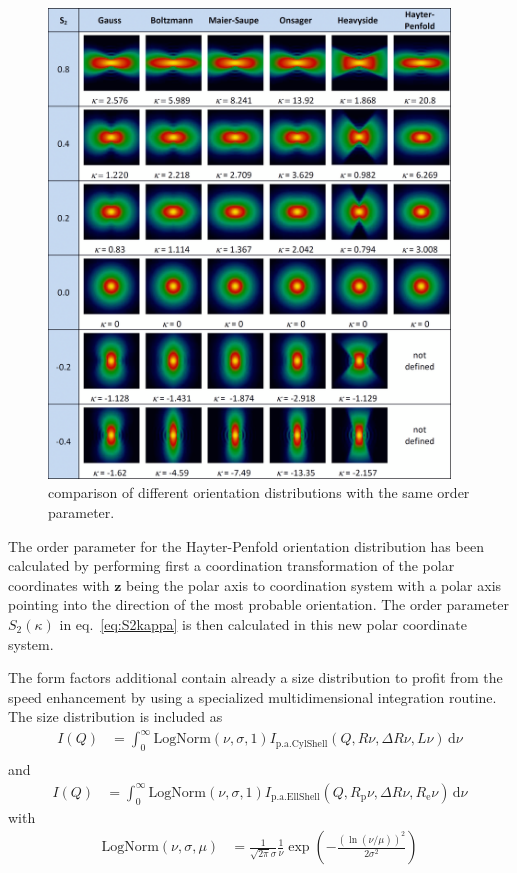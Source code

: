 \begin{figure}[htb]
\begin{center}
\includegraphics[width=0.95\textwidth]{../images/form_factor/cylindrical_obj/pXXXcomparison.png}
\end{center}
\caption{comparison of different orientation distributions with the same order parameter.}
\label{fig:S2_comparision}
\end{figure}

The order parameter for the Hayter-Penfold orientation distribution has been calculated by performing first a coordination transformation of the polar coordinates with $\mathbf{z}$ being the polar axis to coordination system with a polar axis pointing into the direction of the most probable orientation. The order parameter $S_2(\kappa)$ in eq.\ \ref{eq:S2kappa} is then calculated in this new polar coordinate system.

The form factors additional contain already a size distribution to profit from the speed enhancement by using a specialized multidimensional integration routine. The size distribution is included as
\begin{align}
I(Q) &= \int_0^\infty \mathrm{LogNorm}(\nu,\sigma,1) I_\mathrm{p.a.CylShell}(Q,R\nu,\Delta R\nu,L\nu) \, \mathrm{d}\nu \\
\end{align}
and
\begin{align}
I(Q) &= \int_0^\infty \mathrm{LogNorm}(\nu,\sigma,1) I_\mathrm{p.a.EllShell}(Q,R_\mathrm{p}\nu,\Delta R\nu,R_\mathrm{e}\nu) \, \mathrm{d}\nu
\end{align}
 with
\begin{align}
\mathrm{LogNorm}(\nu,\sigma,\mu) &= \frac{1}{\sqrt{2\pi}\sigma}\frac{1}{\nu} \exp\left(-\frac{(\ln(\nu/\mu))^2}{2\sigma^2}\right)
\end{align}

